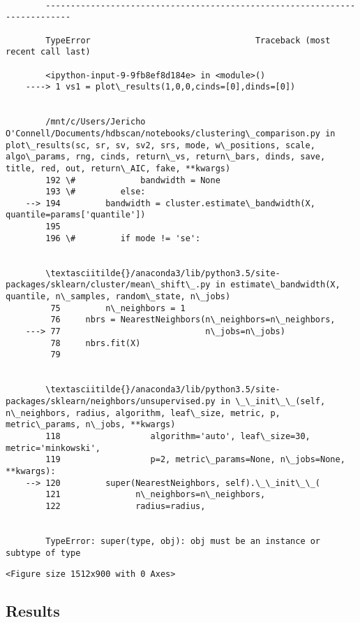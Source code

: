 \documentclass[11pt]{article}
\begin{document}
    \begin{Verbatim}[commandchars=\\\{\}]

        ---------------------------------------------------------------------------

        TypeError                                 Traceback (most recent call last)

        <ipython-input-9-9fb8ef8d184e> in <module>()
    ----> 1 vs1 = plot\_results(1,0,0,cinds=[0],dinds=[0])
    

        /mnt/c/Users/Jericho O'Connell/Documents/hdbscan/notebooks/clustering\_comparison.py in plot\_results(sc, sr, sv, sv2, srs, mode, w\_positions, scale, algo\_params, rng, cinds, return\_vs, return\_bars, dinds, save, title, red, out, return\_AIC, fake, **kwargs)
        192 \#             bandwidth = None
        193 \#         else:
    --> 194         bandwidth = cluster.estimate\_bandwidth(X, quantile=params['quantile'])
        195 
        196 \#         if mode != 'se':
    

        \textasciitilde{}/anaconda3/lib/python3.5/site-packages/sklearn/cluster/mean\_shift\_.py in estimate\_bandwidth(X, quantile, n\_samples, random\_state, n\_jobs)
         75         n\_neighbors = 1
         76     nbrs = NearestNeighbors(n\_neighbors=n\_neighbors,
    ---> 77                             n\_jobs=n\_jobs)
         78     nbrs.fit(X)
         79 
    

        \textasciitilde{}/anaconda3/lib/python3.5/site-packages/sklearn/neighbors/unsupervised.py in \_\_init\_\_(self, n\_neighbors, radius, algorithm, leaf\_size, metric, p, metric\_params, n\_jobs, **kwargs)
        118                  algorithm='auto', leaf\_size=30, metric='minkowski',
        119                  p=2, metric\_params=None, n\_jobs=None, **kwargs):
    --> 120         super(NearestNeighbors, self).\_\_init\_\_(
        121               n\_neighbors=n\_neighbors,
        122               radius=radius,
    

        TypeError: super(type, obj): obj must be an instance or subtype of type

    \end{Verbatim}

    
    \begin{verbatim}
<Figure size 1512x900 with 0 Axes>
    \end{verbatim}

    
    \hypertarget{results}{%
\subsection{Results}\label{results}}
\end{document}
